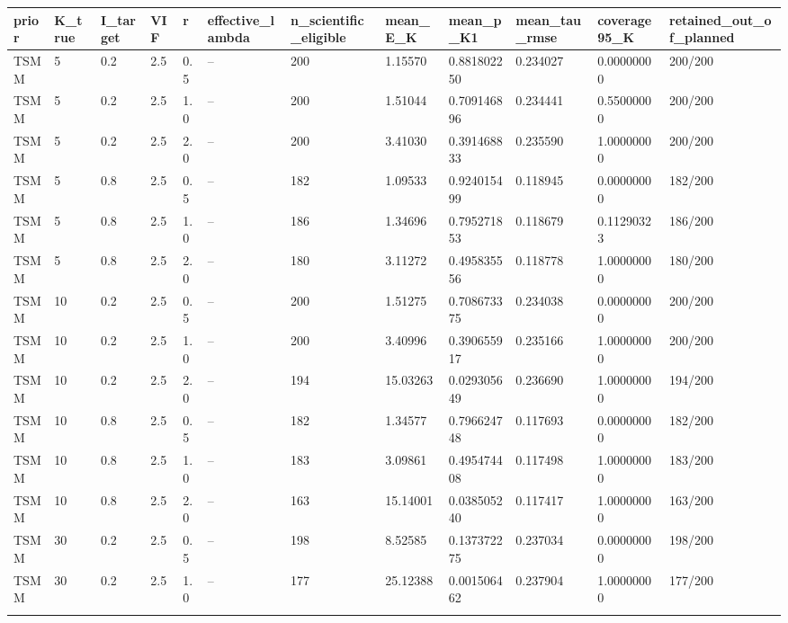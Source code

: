 \begin{longtable}{llllllllllll}
\toprule
prior & K\_true & I\_target & VIF & r & effective\_lambda & n\_scientific\_eligible & mean\_E\_K & mean\_p\_K1 & mean\_tau\_rmse & coverage95\_K & retained\_out\_of\_planned \\
\midrule\endhead
TSMM & 5 & 0.2 & 2.5 & 0.5 & -- & 200 & 1.15570 & 0.881802250 & 0.234027 & 0.00000000 & 200/200 \\ \addlinespace[3pt]
TSMM & 5 & 0.2 & 2.5 & 1.0 & -- & 200 & 1.51044 & 0.709146896 & 0.234441 & 0.55000000 & 200/200 \\ \addlinespace[3pt]
TSMM & 5 & 0.2 & 2.5 & 2.0 & -- & 200 & 3.41030 & 0.391468833 & 0.235590 & 1.00000000 & 200/200 \\ \addlinespace[3pt]
TSMM & 5 & 0.8 & 2.5 & 0.5 & -- & 182 & 1.09533 & 0.924015499 & 0.118945 & 0.00000000 & 182/200 \\ \addlinespace[3pt]
TSMM & 5 & 0.8 & 2.5 & 1.0 & -- & 186 & 1.34696 & 0.795271853 & 0.118679 & 0.11290323 & 186/200 \\ \addlinespace[3pt]
TSMM & 5 & 0.8 & 2.5 & 2.0 & -- & 180 & 3.11272 & 0.495835556 & 0.118778 & 1.00000000 & 180/200 \\ \addlinespace[3pt]
TSMM & 10 & 0.2 & 2.5 & 0.5 & -- & 200 & 1.51275 & 0.708673375 & 0.234038 & 0.00000000 & 200/200 \\ \addlinespace[3pt]
TSMM & 10 & 0.2 & 2.5 & 1.0 & -- & 200 & 3.40996 & 0.390655917 & 0.235166 & 1.00000000 & 200/200 \\ \addlinespace[3pt]
TSMM & 10 & 0.2 & 2.5 & 2.0 & -- & 194 & 15.03263 & 0.029305649 & 0.236690 & 1.00000000 & 194/200 \\ \addlinespace[3pt]
TSMM & 10 & 0.8 & 2.5 & 0.5 & -- & 182 & 1.34577 & 0.796624748 & 0.117693 & 0.00000000 & 182/200 \\ \addlinespace[3pt]
TSMM & 10 & 0.8 & 2.5 & 1.0 & -- & 183 & 3.09861 & 0.495474408 & 0.117498 & 1.00000000 & 183/200 \\ \addlinespace[3pt]
TSMM & 10 & 0.8 & 2.5 & 2.0 & -- & 163 & 15.14001 & 0.038505240 & 0.117417 & 1.00000000 & 163/200 \\ \addlinespace[3pt]
TSMM & 30 & 0.2 & 2.5 & 0.5 & -- & 198 & 8.52585 & 0.137372275 & 0.237034 & 0.00000000 & 198/200 \\ \addlinespace[3pt]
TSMM & 30 & 0.2 & 2.5 & 1.0 & -- & 177 & 25.12388 & 0.001506462 & 0.237904 & 1.00000000 & 177/200 \\ \addlinespace[3pt]

\end{longtable}
